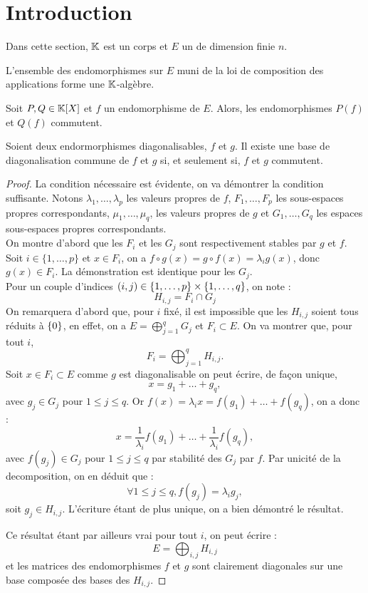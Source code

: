 \documentclass{article}
\begin{document}
\section{Introduction}

Dans cette section, $\mathbb{K}$ est un corps et $E$ un \Kev de dimension finie $n$.

\begin{lem}
L'ensemble des endomorphismes sur $E$ muni de la loi de composition des applications forme une $\mathbb{K}$-algèbre.
\end{lem}

\begin{lem}
Soit $P, Q \in \mathbb{K}[X]$ et $f$ un endomorphisme de $E$. Alors, les endomorphismes $P(f)$ et $Q(f)$ commutent.
\end{lem}

\begin{thm}
Soient deux endormorphismes diagonalisables, $f$ et $g$. Il existe une base de diagonalisation commune de $f$ et $g$ si,
et seulement si, $f$ et $g$ commutent.
\end{thm}

\begin{proof}
La condition nécessaire est évidente, on va démontrer la condition suffisante.
Notons $\lambda_1, \dots, \lambda_p$ les valeurs propres de $f$, 
$F_1, \dots, F_p$ les sous-espaces propres correspondants,
$\mu_1, \dots, \mu_q$, les valeurs propres de $g$ et 
$G_1, \dots, G_q$ les espaces sous-espaces propres correspondants.\\
On montre d'abord que les $F_i$ et les $G_j$ sont respectivement stables par $g$ et $f$. \\
Soit $i \in \{1, \dots, p \}$ et $x \in F_i$, on a $f \circ g (x) = g \circ f (x) = \lambda_i g(x)$, donc $g(x) \in F_i$. 
La démonstration est identique pour les $G_j$. \\
Pour un couple d'indices $(i,j) \in \{ 1,\dots,p \} \times \{ 1, \dots, q \}$, on note :
\[ H_{i,j} = F_i \cap G_j \]
On remarquera d'abord que, pour $i$ fixé, il est impossible que les $H_{i,j}$ soient tous réduits à $\{ 0 \}$,
en effet, on a $E = \bigoplus_{j=1}^q G_j$ et $F_i \subset E$. 
On va montrer que, pour tout $i$, 
\[ F_i = \bigoplus_{j=1}^q H_{i,j} . \]
Soit $x \in F_i \subset E$ comme $g$ est diagonalisable on peut écrire, de façon unique,
\[ x = g_1 + \dots + g_q, \]
avec $g_j \in G_j$ pour $1 \leq j \leq q$. Or $f(x) = \lambda_i x = f(g_1) + \dots + f(g_q)$, on a donc :
\[ x = \dfrac1{\lambda_i} f(g_1) + \dots + \dfrac1{\lambda_i} f(g_q), \]
avec $f(g_j) \in G_j$ pour $1 \leq j \leq q$ par stabilité des $G_j$ par $f$.
Par unicité de la decomposition, on en déduit que :
\[ \forall 1 \leq j \leq q, f(g_j) = \lambda_i g_j, \] 
soit $g_j \in H_{i,j}$. L'écriture étant de plus unique, on a bien démontré le résultat. \newline

Ce résultat étant par ailleurs vrai pour tout $i$, on peut écrire :
\[ E =  \bigoplus_{i, j} H_{i,j} \]
et les matrices des endomorphismes $f$ et $g$ sont clairement diagonales sur une base composée des bases des $H_{i,j}$.
\end{proof}
\end{document}
